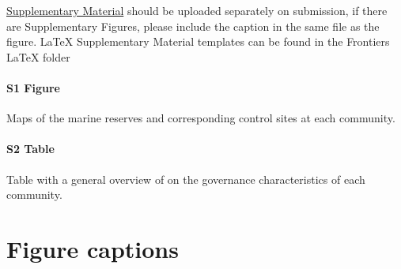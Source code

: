 \documentclass{frontiersSCNS}
\begin{document}
\href{http://home.frontiersin.org/about/author-guidelines#SupplementaryMaterial}{Supplementary Material}
should be uploaded separately on submission, if there are Supplementary
Figures, please include the caption in the same file as the figure.
LaTeX Supplementary Material templates can be found in the Frontiers
LaTeX folder

\paragraph*{S1 Figure}
\label{S1_Figure}

Maps of the marine reserves and corresponding control sites at each
community.

\paragraph*{S2 Table}
\label{S2_Table}

Table with a general overview of on the governance characteristics of
each community.



\section*{Figure captions}
\end{document}

